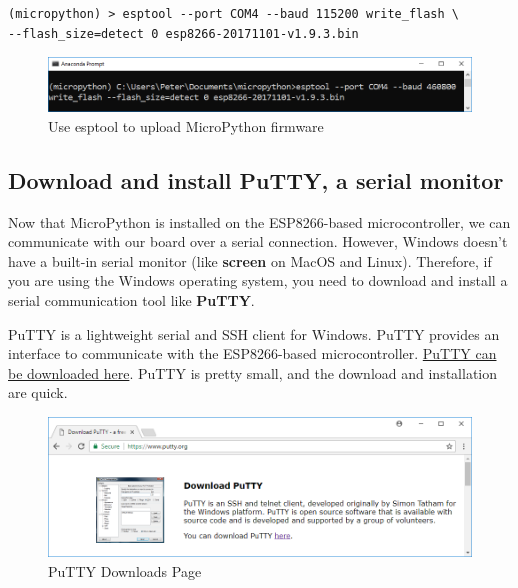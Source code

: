 \documentclass{book}
\makeatletter
\def\maxwidth{\ifdim\Gin@nat@width>\linewidth\linewidth
    \else\Gin@nat@width\fi}
\let\Oldincludegraphics\includegraphics
\renewcommand{\includegraphics}[1]{\Oldincludegraphics[width=.8\maxwidth]{#1}}
\makeatother
\begin{document}
\begin{lstlisting}
(micropython) > esptool --port COM4 --baud 115200 write_flash \
--flash_size=detect 0 esp8266-20171101-v1.9.3.bin
\end{lstlisting}

\begin{figure}
\centering
\includegraphics{images/esptool_write_flash.PNG}
\caption{Use esptool to upload MicroPython firmware}
\end{figure}
    




    
        \subsection{Download and install PuTTY, a serial
monitor}\label{download-and-install-putty-a-serial-monitor}
    




    
        Now that MicroPython is installed on the ESP8266-based microcontroller,
we can communicate with our board over a serial connection. However,
Windows doesn't have a built-in serial monitor (like \textbf{screen} on
MacOS and Linux). Therefore, if you are using the Windows operating
system, you need to download and install a serial communication tool
like \textbf{PuTTY}.

PuTTY is a lightweight serial and SSH client for Windows. PuTTY provides
an interface to communicate with the ESP8266-based microcontroller.
\href{https://www.putty.org/}{PuTTY can be downloaded here}. PuTTY is
pretty small, and the download and installation are quick.

\begin{figure}
\centering
\includegraphics{images/download_putty.PNG}
\caption{PuTTY Downloads Page}
\end{figure}
    
\end{document}
